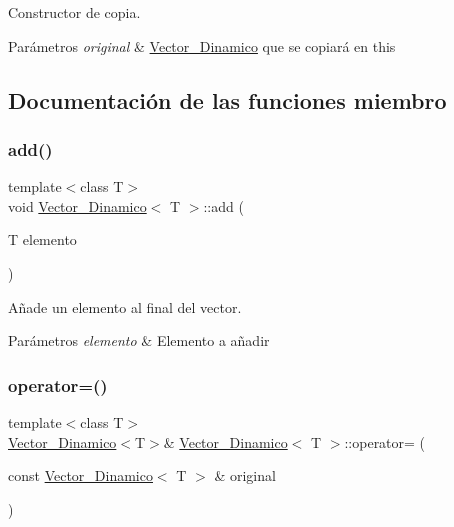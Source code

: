 Constructor de copia. 


\begin{DoxyParams}{Parámetros}
{\em original} & \mbox{\hyperlink{classVector__Dinamico}{Vector\+\_\+\+Dinamico}} que se copiará en this \\
\hline
\end{DoxyParams}


\subsection{Documentación de las funciones miembro}
\mbox{\label{classVector__Dinamico_a048cf839b6f21862f200518adf0e3813}} 
\subsubsection{\texorpdfstring{add()}{add()}}
{\footnotesize\ttfamily template$<$class T$>$ \\
void \mbox{\hyperlink{classVector__Dinamico}{Vector\+\_\+\+Dinamico}}$<$ T $>$\+::add (\begin{DoxyParamCaption}\item[{T}]{elemento }\end{DoxyParamCaption})}



Añade un elemento al final del vector. 


\begin{DoxyParams}{Parámetros}
{\em elemento} & Elemento a añadir \\
\hline
\end{DoxyParams}
\mbox{\label{classVector__Dinamico_afb18b6fd0649b3d62506d95f5ee851cc}} 
\subsubsection{\texorpdfstring{operator=()}{operator=()}}
{\footnotesize\ttfamily template$<$class T$>$ \\
\mbox{\hyperlink{classVector__Dinamico}{Vector\+\_\+\+Dinamico}}$<$T$>$\& \mbox{\hyperlink{classVector__Dinamico}{Vector\+\_\+\+Dinamico}}$<$ T $>$\+::operator= (\begin{DoxyParamCaption}\item[{const \mbox{\hyperlink{classVector__Dinamico}{Vector\+\_\+\+Dinamico}}$<$ T $>$ \&}]{original }\end{DoxyParamCaption})}



